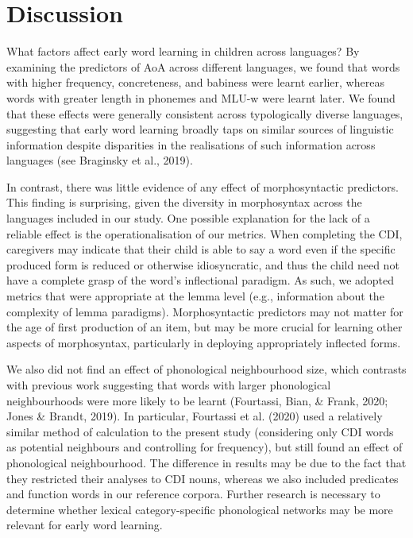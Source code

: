 \documentclass[10pt, letterpaper]{article}
\begin{document}
\hypertarget{discussion}{%
\section{Discussion}\label{discussion}}

What factors affect early word learning in children across languages? By
examining the predictors of AoA across different languages, we found
that words with higher frequency, concreteness, and babiness were learnt
earlier, whereas words with greater length in phonemes and MLU-w were
learnt later. We found that these effects were generally consistent
across typologically diverse languages, suggesting that early word
learning broadly taps on similar sources of linguistic information
despite disparities in the realisations of such information across
languages (see Braginsky et al., 2019).

In contrast, there was little evidence of any effect of morphosyntactic
predictors. This finding is surprising, given the diversity in
morphosyntax across the languages included in our study. One possible
explanation for the lack of a reliable effect is the operationalisation
of our metrics. When completing the CDI, caregivers may indicate that
their child is able to say a word even if the specific produced form is
reduced or otherwise idiosyncratic, and thus the child need not have a
complete grasp of the word's inflectional paradigm. As such, we adopted
metrics that were appropriate at the lemma level (e.g., information
about the complexity of lemma paradigms). Morphosyntactic predictors may
not matter for the age of first production of an item, but may be more
crucial for learning other aspects of morphosyntax, particularly in
deploying appropriately inflected forms.

We also did not find an effect of phonological neighbourhood size, which
contrasts with previous work suggesting that words with larger
phonological neighbourhoods were more likely to be learnt (Fourtassi,
Bian, \& Frank, 2020; Jones \& Brandt, 2019). In particular, Fourtassi
et al. (2020) used a relatively similar method of calculation to the
present study (considering only CDI words as potential neighbours and
controlling for frequency), but still found an effect of phonological
neighbourhood. The difference in results may be due to the fact that
they restricted their analyses to CDI nouns, whereas we also included
predicates and function words in our reference corpora. Further research
is necessary to determine whether lexical category-specific phonological
networks may be more relevant for early word learning.
\end{document}
